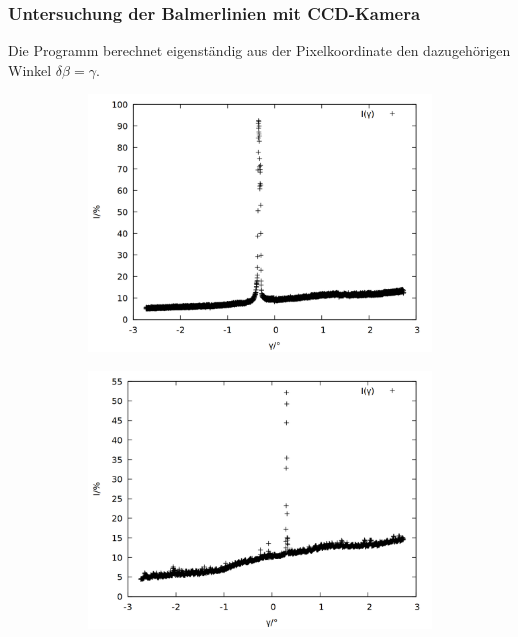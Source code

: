 \subsubsection{Untersuchung der Balmerlinien mit CCD-Kamera}
Die Programm berechnet eigenständig aus der Pixelkoordinate den dazugehörigen Winkel $\delta  \beta = \gamma$. 

\begin{figure}[h]
  \centering
  \begin{subfigure}[c]{0.49\linewidth}
  	\includegraphics[width=1\linewidth]{data/Balmer/out_red_raw.png}
  	\label{fig:red_raw}
  \end{subfigure}
  \begin{subfigure}[c]{0.49\linewidth}
  	\includegraphics[width=1\linewidth]{data/Balmer/out_lightblue_raw.png}

\end{subfigure}
\end{figure}

